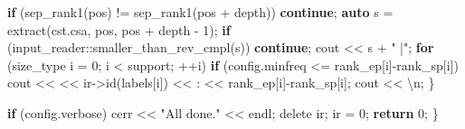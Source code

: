 \documentclass[
]{article}
\newenvironment{Shaded}{\begin{snugshade}}{\end{snugshade}}
\newcommand{\CharTok}[1]{\textcolor[rgb]{0.24,0.68,0.91}{#1}}
\newcommand{\ControlFlowTok}[1]{\textcolor[rgb]{0.99,0.74,0.29}{\textbf{#1}}}
\newcommand{\DecValTok}[1]{\textcolor[rgb]{0.96,0.45,0.00}{#1}}
\newcommand{\KeywordTok}[1]{\textcolor[rgb]{0.81,0.81,0.76}{\textbf{#1}}}
\newcommand{\NormalTok}[1]{\textcolor[rgb]{0.81,0.81,0.76}{#1}}
\newcommand{\OperatorTok}[1]{\textcolor[rgb]{0.81,0.81,0.76}{#1}}
\newcommand{\SpecialCharTok}[1]{\textcolor[rgb]{0.24,0.68,0.91}{#1}}
\newcommand{\StringTok}[1]{\textcolor[rgb]{0.96,0.31,0.31}{#1}}
\begin{document}
\begin{Shaded}
\begin{Highlighting}[]
        \ControlFlowTok{if} \OperatorTok{(}\NormalTok{sep\_rank1}\OperatorTok{(}\NormalTok{pos}\OperatorTok{)} \OperatorTok{!=}\NormalTok{ sep\_rank1}\OperatorTok{(}\NormalTok{pos }\OperatorTok{+}\NormalTok{ depth}\OperatorTok{))}
            \ControlFlowTok{continue}\OperatorTok{;}
        \KeywordTok{auto}\NormalTok{ s }\OperatorTok{=}\NormalTok{ extract}\OperatorTok{(}\NormalTok{cst}\OperatorTok{.}\NormalTok{csa}\OperatorTok{,}\NormalTok{ pos}\OperatorTok{,}\NormalTok{ pos }\OperatorTok{+}\NormalTok{ depth }\OperatorTok{{-}} \DecValTok{1}\OperatorTok{);}
        \ControlFlowTok{if} \OperatorTok{(}\NormalTok{input\_reader}\OperatorTok{::}\NormalTok{smaller\_than\_rev\_cmpl}\OperatorTok{(}\NormalTok{s}\OperatorTok{))}
            \ControlFlowTok{continue}\OperatorTok{;}
\NormalTok{        cout }\OperatorTok{\textless{}\textless{}}\NormalTok{ s }\OperatorTok{+} \StringTok{" |"}\OperatorTok{;}
        \ControlFlowTok{for} \OperatorTok{(}\NormalTok{size\_type i }\OperatorTok{=} \DecValTok{0}\OperatorTok{;}\NormalTok{ i }\OperatorTok{\textless{}}\NormalTok{ support}\OperatorTok{;} \OperatorTok{++}\NormalTok{i}\OperatorTok{)}
            \ControlFlowTok{if} \OperatorTok{(}\NormalTok{config}\OperatorTok{.}\NormalTok{minfreq }\OperatorTok{\textless{}=}\NormalTok{ rank\_ep}\OperatorTok{[}\NormalTok{i}\OperatorTok{]{-}}\NormalTok{rank\_sp}\OperatorTok{[}\NormalTok{i}\OperatorTok{])}
\NormalTok{                cout }\OperatorTok{\textless{}\textless{}} \CharTok{\textquotesingle{} \textquotesingle{}} \OperatorTok{\textless{}\textless{}}\NormalTok{ ir}\OperatorTok{{-}\textgreater{}}\NormalTok{id}\OperatorTok{(}\NormalTok{labels}\OperatorTok{[}\NormalTok{i}\OperatorTok{])} \OperatorTok{\textless{}\textless{}} \CharTok{\textquotesingle{}:\textquotesingle{}} \OperatorTok{\textless{}\textless{}}\NormalTok{ rank\_ep}\OperatorTok{[}\NormalTok{i}\OperatorTok{]{-}}\NormalTok{rank\_sp}\OperatorTok{[}\NormalTok{i}\OperatorTok{];}
\NormalTok{        cout }\OperatorTok{\textless{}\textless{}} \CharTok{\textquotesingle{}}\SpecialCharTok{\textbackslash{}n}\CharTok{\textquotesingle{}}\OperatorTok{;}
    \OperatorTok{\}}
    
    \ControlFlowTok{if} \OperatorTok{(}\NormalTok{config}\OperatorTok{.}\NormalTok{verbose}\OperatorTok{)}
\NormalTok{        cerr }\OperatorTok{\textless{}\textless{}} \StringTok{"All done."} \OperatorTok{\textless{}\textless{}}\NormalTok{ endl}\OperatorTok{;}    
\NormalTok{    delete ir}\OperatorTok{;}\NormalTok{ ir }\OperatorTok{=} \DecValTok{0}\OperatorTok{;}
    \ControlFlowTok{return} \DecValTok{0}\OperatorTok{;}
\OperatorTok{\}}
\end{Highlighting}
\end{Shaded}
\end{document}

